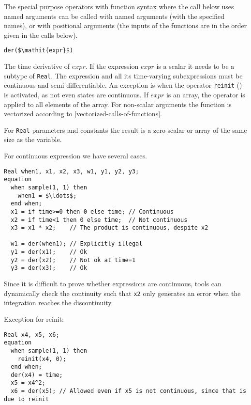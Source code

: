 The special purpose operators with function syntax where the call below uses named arguments can be called with named arguments (with the specified names), or with positional arguments (the inputs of the functions are in the order given in the calls below).

\begin{operatordefinition}[der]
\begin{synopsis}\begin{lstlisting}
der($\mathit{expr}$)
\end{lstlisting}\end{synopsis}
\begin{semantics}
The time derivative of $\mathit{expr}$.
If the expression $\mathit{expr}$ is a scalar it needs to be a subtype of \lstinline!Real!.
The expression and all its time-varying subexpressions must be continuous and semi-differentiable.
An exception is when the operator \lstinline!reinit! () is activated, as not even states are continuous.
If $\mathit{expr}$ is an array, the operator is applied to all elements of the array.
For non-scalar arguments the function is vectorized according to \cref{vectorized-calls-of-functions}.
\begin{nonnormative}
For \lstinline!Real! parameters and constants the result is a zero scalar or array of the same size as the variable.
\end{nonnormative}

\begin{example}
For continuous expression we have several cases.
\begin{lstlisting}[language=modelica]
  Real when1, x1, x2, x3, w1, y1, y2, y3;
equation
  when sample(1, 1) then
    when1 = $\ldots$;
  end when;
  x1 = if time>=0 then 0 else time; // Continuous
  x2 = if time<1 then 0 else time;  // Not continuous
  x3 = x1 * x2;    // The product is continuous, despite x2

  w1 = der(when1); // Explicitly illegal
  y1 = der(x1);    // Ok
  y2 = der(x2);    // Not ok at time=1
  y3 = der(x3);    // Ok
\end{lstlisting}
Since it is difficult to prove whether expressions are continuous, tools can dynamically check the continuity such that \lstinline!x2! only generates an error when the integration reaches the discontinuity.
\end{example}

\begin{example}
Exception for reinit:
\begin{lstlisting}[language=modelica]
  Real x4, x5, x6;
equation
  when sample(1, 1) then
    reinit(x4, 0);
  end when;
  der(x4) = time;
  x5 = x4^2;
  x6 = der(x5); // Allowed even if x5 is not continuous, since that is due to reinit
\end{lstlisting}
\end{example}

\end{semantics}
\end{operatordefinition}

